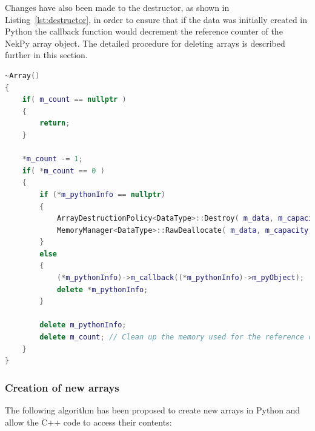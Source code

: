 Changes have also been made to the destructor, as shown in Listing~\ref{lst:destructor}, 
in order to ensure that if the data was initially created in Python the callback function 
would decrement the reference counter of the NekPy array object. The detailed procedure 
for deleting arrays is described further in this section.

\begin{lstlisting}[caption={The modified destructor for C++ arrays.}, label={lst:destructor}, language=C++]
~Array()
{
    if( m_count == nullptr )
    {
        return;
    }

    *m_count -= 1;
    if( *m_count == 0 )
    {
        if (*m_pythonInfo == nullptr)
        {
            ArrayDestructionPolicy<DataType>::Destroy( m_data, m_capacity );
            MemoryManager<DataType>::RawDeallocate( m_data, m_capacity );
        }
        else
        {
            (*m_pythonInfo)->m_callback((*m_pythonInfo)->m_pyObject);
            delete *m_pythonInfo;
        }

        delete m_pythonInfo;
        delete m_count; // Clean up the memory used for the reference count.
    }
}
\end{lstlisting}

\subsubsection{Creation of new arrays}

The following algorithm has been proposed to create new arrays in Python and allow the 
C++ code to access their contents:

